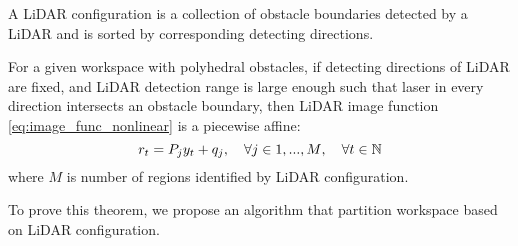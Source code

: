 \begin{definition}
    A LiDAR configuration is a collection of obstacle boundaries detected by a LiDAR and is sorted by 
    corresponding detecting directions.
\end{definition}

\begin{theorem}
    For a given workspace with polyhedral obstacles, if detecting directions of LiDAR are fixed, 
    and LiDAR detection range is large enough such that laser in every direction intersects an obstacle boundary, 
    then LiDAR image function \eqref{eq:image_func_nonlinear} is a piecewise affine:
    \begin{equation}
        \label{eq:image_func}
        r_t = P_j y_t + q_j, \quad \forall j \in {1, ..., M}, \quad \forall t \in {\mathbb{N}}
    \end{equation}
    where $M$ is number of regions identified by LiDAR configuration.
\end{theorem}    

To prove this theorem, we propose an algorithm that partition workspace based on LiDAR configuration.


